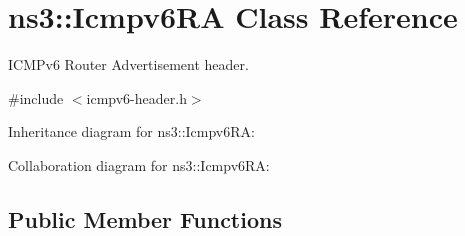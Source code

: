 \hypertarget{classns3_1_1Icmpv6RA}{}\section{ns3\+:\+:Icmpv6\+RA Class Reference}
\label{classns3_1_1Icmpv6RA}


I\+C\+M\+Pv6 Router Advertisement header.  




{\ttfamily \#include $<$icmpv6-\/header.\+h$>$}



Inheritance diagram for ns3\+:\+:Icmpv6\+RA\+:


Collaboration diagram for ns3\+:\+:Icmpv6\+RA\+:
\subsection*{Public Member Functions}
